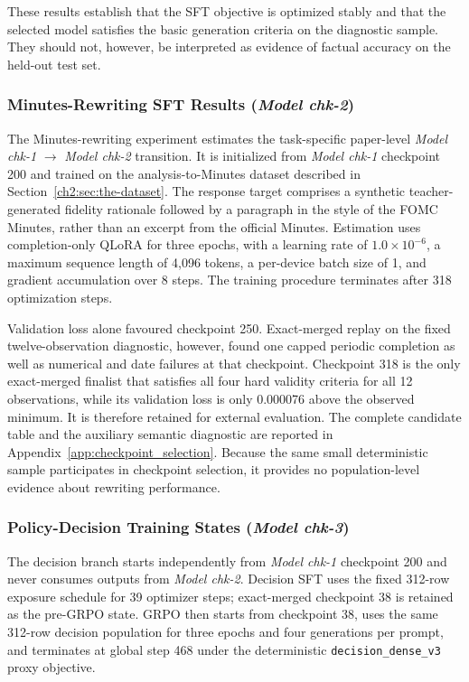 These results establish that the SFT objective is optimized stably and that the
selected model satisfies the basic generation criteria on the diagnostic
sample.  They should not, however, be interpreted as evidence of factual
accuracy on the held-out test set.


\subsubsection*{Minutes-Rewriting SFT Results (\textit{Model chk-2})}

The Minutes-rewriting experiment estimates the task-specific paper-level
\textit{Model chk-1} $\rightarrow$ \textit{Model chk-2} transition. It is
initialized from \textit{Model chk-1} checkpoint 200 and trained on the
analysis-to-Minutes dataset
described in Section~\ref{ch2:sec:the-dataset}.  The response target comprises
a synthetic teacher-generated fidelity rationale followed by a paragraph in
the style of the FOMC Minutes, rather than an excerpt from the official
Minutes.  Estimation uses completion-only
QLoRA for three epochs, with a learning rate of \(1.0\times10^{-6}\), a
maximum sequence length of 4,096 tokens, a per-device batch size of 1, and
gradient accumulation over 8 steps.  The training procedure terminates after
318 optimization steps.

Validation loss alone favoured checkpoint 250. Exact-merged replay on the
fixed twelve-observation diagnostic, however, found one capped periodic
completion as well as numerical and date failures at that checkpoint.
Checkpoint 318 is the only exact-merged finalist that satisfies all four hard
validity criteria for all 12 observations, while its validation loss is only
0.000076 above the observed minimum. It is therefore retained for external
evaluation. The complete candidate table and the auxiliary semantic diagnostic
are reported in Appendix~\ref{app:checkpoint_selection}. Because the same
small deterministic sample participates in checkpoint selection, it provides
no population-level evidence about rewriting performance.



\subsubsection*{Policy-Decision Training States (\textit{Model chk-3})}

The decision branch starts independently from \textit{Model chk-1} checkpoint
200 and never consumes outputs from \textit{Model chk-2}. Decision SFT uses the
fixed 312-row exposure schedule for 39 optimizer steps; exact-merged checkpoint
38 is retained as the pre-GRPO state. GRPO then starts from checkpoint 38, uses
the same 312-row decision population for three epochs and four generations per
prompt, and terminates at global step 468 under the deterministic
\texttt{decision\_dense\_v3} proxy objective.

